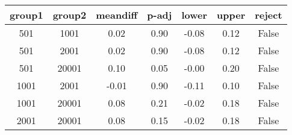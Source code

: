 \begin{tabular}{|c|c|c|c|c|c|c|}
\toprule
 group1 &  group2 &  meandiff &  p-adj &  lower &  upper &  reject \\
\midrule
    501 &    1001 &      0.02 &   0.90 &  -0.08 &   0.12 &   False \\
    501 &    2001 &      0.02 &   0.90 &  -0.08 &   0.12 &   False \\
    501 &   20001 &      0.10 &   0.05 &  -0.00 &   0.20 &   False \\
   1001 &    2001 &     -0.01 &   0.90 &  -0.11 &   0.10 &   False \\
   1001 &   20001 &      0.08 &   0.21 &  -0.02 &   0.18 &   False \\
   2001 &   20001 &      0.08 &   0.15 &  -0.02 &   0.18 &   False \\
\bottomrule
\end{tabular}

